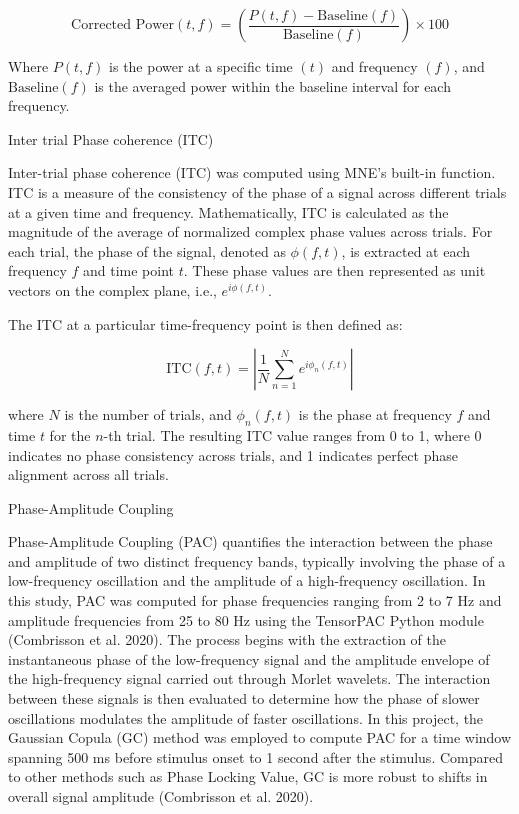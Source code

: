 \documentclass[
  letterpaper,
  DIV=11,
  numbers=noendperiod]{scrartcl}
\begin{document}
\[
\text{Corrected Power}(t,f) = (\frac{P(t,f)-\text{Baseline}(f)}{\text{Baseline}(f)}) \times 100 
\]

Where \(P(t,f)\) is the power at a specific time \((t)\) and frequency
\((f)\), and \(\text{Baseline}(f)\) is the averaged power within the
baseline interval for each frequency.

Inter trial Phase coherence (ITC)

Inter-trial phase coherence (ITC) was computed using MNE's built-in
function. ITC is a measure of the consistency of the phase of a signal
across different trials at a given time and frequency. Mathematically,
ITC is calculated as the magnitude of the average of normalized complex
phase values across trials. For each trial, the phase of the signal,
denoted as \(\phi(f, t)\), is extracted at each frequency \(f\) and time
point \(t\). These phase values are then represented as unit vectors on
the complex plane, i.e., \(e^{i\phi(f, t)}\).

The ITC at a particular time-frequency point is then defined as:

\[
\text{ITC}(f, t) = \left| \frac{1}{N} \sum_{n=1}^{N} e^{i\phi_n(f, t)} \right|
\]

where \(N\) is the number of trials, and \(\phi_n(f, t)\) is the phase
at frequency \(f\) and time \(t\) for the \(n\)-th trial. The resulting
ITC value ranges from 0 to 1, where 0 indicates no phase consistency
across trials, and 1 indicates perfect phase alignment across all
trials.

Phase-Amplitude Coupling

Phase-Amplitude Coupling (PAC) quantifies the interaction between the
phase and amplitude of two distinct frequency bands, typically involving
the phase of a low-frequency oscillation and the amplitude of a
high-frequency oscillation. In this study, PAC was computed for phase
frequencies ranging from 2 to 7 Hz and amplitude frequencies from 25 to
80 Hz using the TensorPAC Python module (Combrisson et al. 2020). The
process begins with the extraction of the instantaneous phase of the
low-frequency signal and the amplitude envelope of the high-frequency
signal carried out through Morlet wavelets. The interaction between
these signals is then evaluated to determine how the phase of slower
oscillations modulates the amplitude of faster oscillations. In this
project, the Gaussian Copula (GC) method was employed to compute PAC for
a time window spanning 500 ms before stimulus onset to 1 second after
the stimulus. Compared to other methods such as Phase Locking Value, GC
is more robust to shifts in overall signal amplitude (Combrisson et al.
2020).
\end{document}
